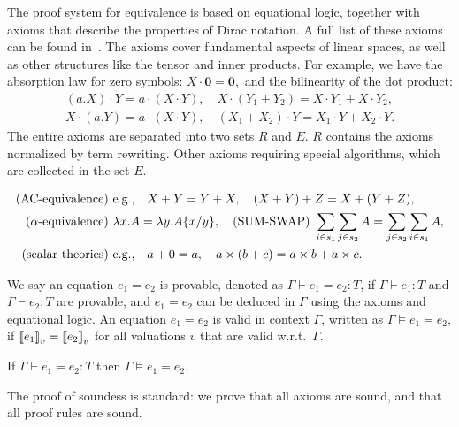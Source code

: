 The proof system for equivalence is based on equational logic, together with axioms that describe the properties of Dirac notation. A full list of these axioms can be found in~. The axioms cover fundamental aspects of linear spaces, as well as other structures like the tensor and inner products. For example, we have the absorption law for zero symbols:
\(X \cdot \mathbf{0} = \mathbf{0},\)
and the bilinearity of the dot product:
\begin{align*}
(a.X) \cdot Y = a \cdot (X \cdot Y), \quad X \cdot (Y_1 + Y_2) = X \cdot Y_1 + X \cdot Y_2, \\
X \cdot (a.Y) = a \cdot (X \cdot Y), \quad (X_1 + X_2) \cdot Y = X_1 \cdot Y + X_2 \cdot Y.
\end{align*}
The entire axioms are separated into two sets $R$ and $E$.
$R$ contains the axioms normalized by term rewriting. Other axioms requiring special algorithms, which are collected in the set $E$.
\begin{definition}
\label{def: axiom E}
\begin{align*}
    \textup{(AC-equivalence)} &\ \text{e.g.,} \quad X + Y = Y + X, \quad (X + Y) + Z = X + (Y + Z), \\
    \textup{($\alpha$-equivalence)} &\ \lambda x . A = \lambda y . A\{x/y\},
    \quad
    \textup{(SUM-SWAP)} \ \sum_{i \in s_1} \sum_{j \in s_2} A = \sum_{j \in s_2} \sum_{i \in s_1} A, \\
    \textup{(scalar theories)} &\ \text{e.g.,} \quad a + 0 = a, \quad a \times (b + c) = a \times b + a \times c.
\end{align*}
\end{definition}



We say an equation $e_1 = e_2$ is provable, denoted as $\Gamma \vdash e_1 = e_2 : T$, if $\Gamma \vdash e_1 : T$ and $\Gamma \vdash e_2 : T$ are provable, and $e_1 = e_2$ can be deduced in $\Gamma$ using the axioms and equational logic.
An equation \( e_1 = e_2 \) is valid in context $\Gamma$, written as \(
\Gamma \vDash e_1 = e_2 \), if \( {\llbracket e_1 \rrbracket}_v = {\llbracket e_2 \rrbracket}_v \) for
all valuations \( v \) that are valid w.r.t.\, \( \Gamma \).

\begin{theorem}\label{lem: axiom sound}
If \( \Gamma \vdash e_1 = e_2 :T \) then \( \Gamma \vDash e_1 = e_2\).
\end{theorem}
The proof of soundess is standard: we prove that all axioms are sound,
and that all proof rules are sound.

